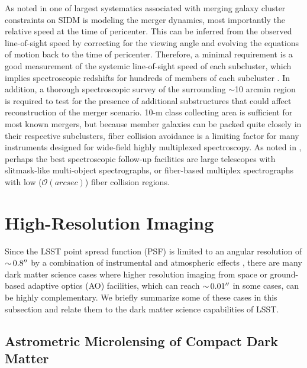 As noted in  one of largest systematics associated with merging galaxy cluster constraints on SIDM is modeling the merger dynamics, most importantly the relative speed at the time of
pericenter. This can be inferred from the observed line-of-sight speed by correcting for the viewing angle and evolving the equations of motion back to the time of pericenter. Therefore, a minimal requirement is a good measurement of the systemic line-of-sight speed of each subcluster, which implies spectroscopic redshifts for hundreds of members of each subcluster \citep[\eg,][]{Golovich:2018}. In addition, a thorough spectroscopic survey of the surrounding $\sim$10 arcmin region is required to test for the presence of additional substructures that could affect reconstruction of the merger scenario. 10-m class collecting area is sufficient for most known mergers, but because member galaxies can be packed quite closely in their respective subclusters, fiber collision avoidance is a limiting factor for many instruments designed for wide-field highly multiplexed spectroscopy.  As noted in \citet{2016arXiv161001661N}, perhaps the best spectroscopic follow-up facilities are large telescopes with slitmask-like multi-object spectrographs, or fiber-based multiplex spectrographs with low ($\mathcal{O}(\unit{arcsec})$) fiber collision regions.

\section{High-Resolution Imaging }
\label{sec:highres}


Since the LSST point spread function (PSF) is limited to an angular resolution of $ {\sim}\, 0.8''$ by a combination of instrumental and  atmospheric effects \citep{0805.2366}, there are many dark matter science cases where higher resolution imaging from space or ground-based adaptive optics (AO) facilities, which can reach $ {\sim}\, 0.01''$ in some cases, can be highly complementary. We briefly summarize some of these cases in this subsection and relate them to the dark matter science capabilities of LSST.

\subsection{Astrometric Microlensing of Compact Dark Matter }
\label{sec:astrometric_microlens}

